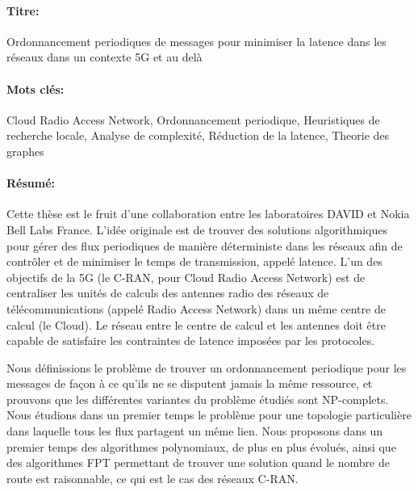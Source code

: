 \begin{mdframed}[linecolor=Prune,linewidth=1]
\vspace{-.25cm}
\paragraph*{Titre:} Ordonnancement periodiques de messages pour minimiser la latence dans les réseaux dans un contexte 5G et au delà


\begin{small}
\vspace{-.25cm}
\paragraph*{Mots clés:}  Cloud Radio Access Network, Ordonnancement periodique, Heuristiques de recherche locale, Analyse de complexité, Réduction de la latence, Theorie des graphes

\vspace{-.5cm}
\begin{multicols}{2}
\paragraph*{Résumé:} Cette thèse est le fruit d’une collaboration entre les laboratoires DAVID et Nokia Bell Labs France.
L’idée originale est de trouver des solutions algorithmiques pour gérer des flux periodiques de manière déterministe dans les réseaux afin de contrôler et de minimiser le temps de transmission, appelé latence. L’un des objectifs de la 5G (le C-RAN, pour Cloud Radio Access Network) est de centraliser les unités de calculs des antennes radio des réseaux de télécommunications (appelé Radio Access Network) dans un même centre de calcul (le Cloud). Le réseau entre le centre de calcul et les antennes doit être capable de satisfaire les contraintes de latence imposées par les protocoles.

Nous définissions le problème de trouver un ordonnancement periodique pour les messages de façon à ce qu'ils ne se disputent jamais la même ressource, et prouvons que les différentes variantes du problème étudiés sont NP-complets. Nous étudions dans un premier temps le problème pour une topologie particulière dans laquelle tous les flux partagent un même lien. Nous proposons dans un premier temps des algorithmes polynomiaux, de plus en plus évolués, ainsi que des algorithmes FPT permettant de trouver une solution quand le nombre de route est raisonnable, ce qui est le cas des réseaux C-RAN.


\end{multicols}
\end{small}
\end{mdframed}
